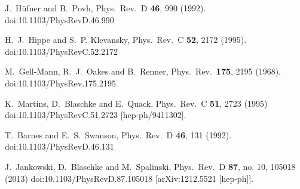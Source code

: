 \documentclass[12pt]{article}
\begin{document}
\begin{thebibliography}{99}
  J.~H{\"u}fner and B.~Povh,
  Phys.\ Rev.\ D {\bf 46}, 990 (1992).
  doi:10.1103/PhysRevD.46.990


  H.~J.~Hippe and S.~P. Klevansky,
  Phys.\ Rev.\ C {\bf 52}, 2172 (1995).
  doi:10.1103/PhysRevC.52.2172
	
  M.~Gell-Mann, R.~J.~Oakes and B.~Renner,
  Phys.\ Rev.\  {\bf 175}, 2195 (1968).
  doi:10.1103/PhysRev.175.2195
	
  K.~Martins, D.~Blaschke and E.~Quack,
  Phys.\ Rev.\ C {\bf 51}, 2723 (1995)
  doi:10.1103/PhysRevC.51.2723
  [hep-ph/9411302].

  T.~Barnes and E.~S.~Swanson,
  Phys.\ Rev.\ D {\bf 46}, 131 (1992).
  doi:10.1103/PhysRevD.46.131
%
	
  J.~Jankowski, D.~Blaschke and M.~Spalinski,
  Phys.\ Rev.\ D {\bf 87}, no. 10, 105018 (2013)
  doi:10.1103/PhysRevD.87.105018
  [arXiv:1212.5521 [hep-ph]].
	

\end{thebibliography}
\end{document}
